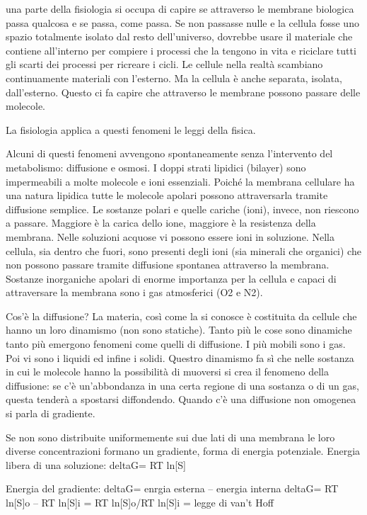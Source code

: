 \documentclass[]{article}
\begin{document}
una parte della fisiologia si occupa di capire se attraverso le membrane
biologica passa qualcosa e se passa, come passa. Se non passasse nulle e
la cellula fosse uno spazio totalmente isolato dal resto dell'universo,
dovrebbe usare il materiale che contiene all'interno per compiere i
processi che la tengono in vita e riciclare tutti gli scarti dei
processi per ricreare i cicli. Le cellule nella realtà scambiano
continuamente materiali con l'esterno. Ma la cellula è anche separata,
isolata, dall'esterno. Questo ci fa capire che attraverso le membrane
possono passare delle molecole.

La fisiologia applica a questi fenomeni le leggi della fisica.

Alcuni di questi fenomeni avvengono spontaneamente senza l'intervento
del metabolismo: diffusione e osmosi. I doppi strati lipidici (bilayer)
sono impermeabili a molte molecole e ioni essenziali. Poiché la membrana
cellulare ha una natura lipidica tutte le molecole apolari possono
attraversarla tramite diffusione semplice. Le sostanze polari e quelle
cariche (ioni), invece, non riescono a passare. Maggiore è la carica
dello ione, maggiore è la resistenza della membrana. Nelle soluzioni
acquose vi possono essere ioni in soluzione. Nella cellula, sia dentro
che fuori, sono presenti degli ioni (sia minerali che organici) che non
possono passare tramite diffusione spontanea attraverso la membrana.
Sostanze inorganiche apolari di enorme importanza per la cellula e
capaci di attraversare la membrana sono i gas atmosferici (O2 e N2).

Cos'è la diffusione? La materia, così come la si conosce è costituita da
cellule che hanno un loro dinamismo (non sono statiche). Tanto più le
cose sono dinamiche tanto più emergono fenomeni come quelli di
diffusione. I più mobili sono i gas. Poi vi sono i liquidi ed infine i
solidi. Questro dinamismo fa sì che nelle sostanza in cui le molecole
hanno la possibilità di muoversi si crea il fenomeno della diffusione:
se c'è un'abbondanza in una certa regione di una sostanza o di un gas,
questa tenderà a spostarsi diffondendo. Quando c'è una diffusione non
omogenea si parla di gradiente.

Se non sono distribuite uniformemente sui due lati di una membrana le
loro diverse concentrazioni formano un gradiente, forma di energia
potenziale. Energia libera di una soluzione: deltaG= RT ln{[}S{]}

Energia del gradiente: deltaG= enrgia esterna -- energia interna deltaG=
RT ln{[}S{]}o -- RT ln{[}S{]}i = RT ln{[}S{]}o/RT ln{[}S{]}i = legge di
van't Hoff
\end{document}
